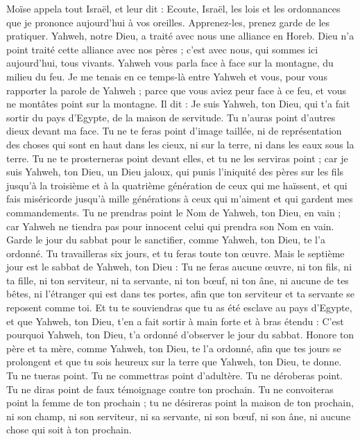 \begin{multicols}{2}
\VerseOne{}Moïse appela tout Israël, et leur dit : Ecoute, Israël, les lois et les ordonnances que je prononce aujourd'hui à vos oreilles. Apprenez-les, prenez garde de les pratiquer.
Yahweh, notre Dieu, a traité avec nous une alliance en Horeb.
Dieu n'a point traité cette alliance avec nos pères ; c'est avec nous, qui sommes ici aujourd'hui, tous vivants.
Yahweh vous parla face à face sur la montagne, du milieu du feu.
Je me tenais en ce temps-là entre Yahweh et vous, pour vous rapporter la parole de Yahweh ; parce que vous aviez peur face à ce feu, et vous ne montâtes point sur la montagne. Il dit :
Je suis Yahweh, ton Dieu, qui t'a fait sortir du pays d'Egypte, de la maison de servitude.
Tu n'auras point d'autres dieux devant ma face.
Tu ne te feras point d'image taillée, ni de représentation des choses qui sont en haut dans les cieux, ni sur la terre, ni dans les eaux sous la terre.
Tu ne te prosterneras point devant elles, et tu ne les serviras point ; car je suis Yahweh, ton Dieu, un Dieu jaloux, qui punis l'iniquité des pères sur les fils jusqu'à la troisième et à la quatrième génération de ceux qui me haïssent,
et qui fais miséricorde jusqu'à mille générations à ceux qui m'aiment et qui gardent mes commandements.
Tu ne prendras point le Nom de Yahweh, ton Dieu, en vain ; car Yahweh ne tiendra pas pour innocent celui qui prendra son Nom en vain.
Garde le jour du sabbat pour le sanctifier, comme Yahweh, ton Dieu, te l'a ordonné.
Tu travailleras six jours, et tu feras toute ton œuvre.
Mais le septième jour est le sabbat de Yahweh, ton Dieu : Tu ne feras aucune œuvre, ni ton fils, ni ta fille, ni ton serviteur, ni ta servante, ni ton bœuf, ni ton âne, ni aucune de tes bêtes, ni l'étranger qui est dans tes portes, afin que ton serviteur et ta servante se reposent comme toi.
Et tu te souviendras que tu as été esclave au pays d'Egypte, et que Yahweh, ton Dieu, t'en a fait sortir à main forte et à bras étendu : C'est pourquoi Yahweh, ton Dieu, t'a ordonné d'observer le jour du sabbat.
Honore ton père et ta mère, comme Yahweh, ton Dieu, te l'a ordonné, afin que tes jours se prolongent et que tu sois heureux sur la terre que Yahweh, ton Dieu, te donne.
Tu ne tueras point.
Tu ne commettras point d'adultère.
Tu ne déroberas point.
Tu ne diras point de faux témoignage contre ton prochain.
Tu ne convoiteras point la femme de ton prochain ; tu ne désireras point la maison de ton prochain, ni son champ, ni son serviteur, ni sa servante, ni son bœuf, ni son âne, ni aucune chose qui soit à ton prochain.

\end{multicols}

